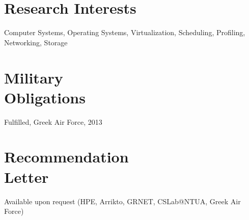 \documentclass[margin,centered]{res}
\begin{document}
\begin{resume}
\section{\sc Research Interests}
Computer Systems, Operating Systems, Virtualization, Scheduling, Profiling, Networking, Storage

\section{\sc Military\\Obligations}
Fulfilled, Greek Air Force, 2013

\section{\sc Recommendation\\Letter}
Available upon request (HPE, Arrikto, GRNET, CSLab@NTUA, Greek Air Force)

\end{resume}

\def\enoteheading{\section{}\rule[0pt]{\textwidth}{0.4pt}}
\parskip=2pt
\theendnotes
\end{document}
